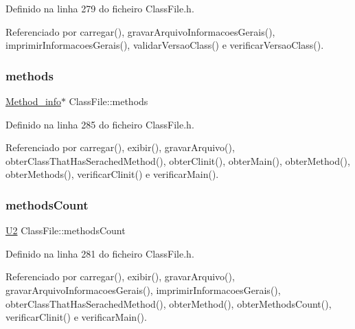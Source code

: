 Definido na linha 279 do ficheiro Class\+File.\+h.



Referenciado por carregar(), gravar\+Arquivo\+Informacoes\+Gerais(), imprimir\+Informacoes\+Gerais(), validar\+Versao\+Class() e verificar\+Versao\+Class().

\mbox{\label{classClassFile_a5906980e6c5121e5a864346fd3617083}} 
\subsubsection{\texorpdfstring{methods}{methods}}
{\footnotesize\ttfamily \hyperlink{structMethod__info}{Method\+\_\+info}$\ast$ Class\+File\+::methods\hspace{0.3cm}{\ttfamily [private]}}



Definido na linha 285 do ficheiro Class\+File.\+h.



Referenciado por carregar(), exibir(), gravar\+Arquivo(), obter\+Class\+That\+Has\+Serached\+Method(), obter\+Clinit(), obter\+Main(), obter\+Method(), obter\+Methods(), verificar\+Clinit() e verificar\+Main().

\mbox{\label{classClassFile_a4c362d4adfeaad02f4517caf1ba58103}} 
\subsubsection{\texorpdfstring{methods\+Count}{methodsCount}}
{\footnotesize\ttfamily \hyperlink{BasicTypes_8h_a90240657108b1b457eef9d3f76e0202e}{U2} Class\+File\+::methods\+Count\hspace{0.3cm}{\ttfamily [private]}}



Definido na linha 281 do ficheiro Class\+File.\+h.



Referenciado por carregar(), exibir(), gravar\+Arquivo(), gravar\+Arquivo\+Informacoes\+Gerais(), imprimir\+Informacoes\+Gerais(), obter\+Class\+That\+Has\+Serached\+Method(), obter\+Method(), obter\+Methods\+Count(), verificar\+Clinit() e verificar\+Main().

